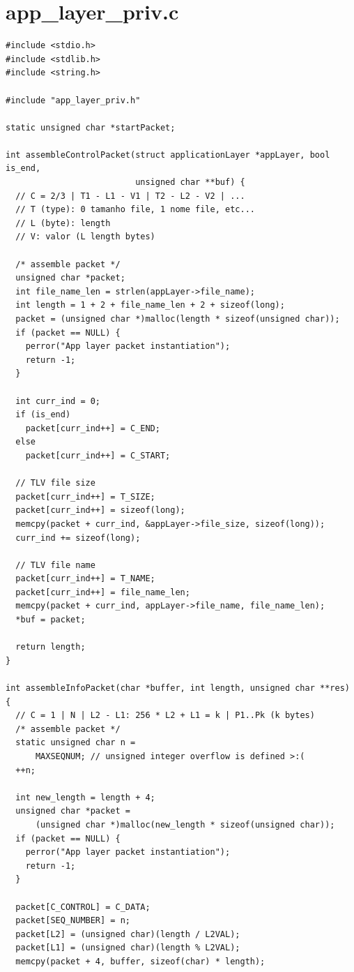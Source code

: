 \documentclass[11pt]{report}
\begin{document}
\section{app\_layer\_priv.c}

\begin{lstlisting}
#include <stdio.h>
#include <stdlib.h>
#include <string.h>

#include "app_layer_priv.h"

static unsigned char *startPacket;

int assembleControlPacket(struct applicationLayer *appLayer, bool is_end,
                          unsigned char **buf) {
  // C = 2/3 | T1 - L1 - V1 | T2 - L2 - V2 | ...
  // T (type): 0 tamanho file, 1 nome file, etc...
  // L (byte): length
  // V: valor (L length bytes)

  /* assemble packet */
  unsigned char *packet;
  int file_name_len = strlen(appLayer->file_name);
  int length = 1 + 2 + file_name_len + 2 + sizeof(long);
  packet = (unsigned char *)malloc(length * sizeof(unsigned char));
  if (packet == NULL) {
    perror("App layer packet instantiation");
    return -1;
  }

  int curr_ind = 0;
  if (is_end)
    packet[curr_ind++] = C_END;
  else
    packet[curr_ind++] = C_START;

  // TLV file size
  packet[curr_ind++] = T_SIZE;
  packet[curr_ind++] = sizeof(long);
  memcpy(packet + curr_ind, &appLayer->file_size, sizeof(long));
  curr_ind += sizeof(long);

  // TLV file name
  packet[curr_ind++] = T_NAME;
  packet[curr_ind++] = file_name_len;
  memcpy(packet + curr_ind, appLayer->file_name, file_name_len);
  *buf = packet;

  return length;
}

int assembleInfoPacket(char *buffer, int length, unsigned char **res) {
  // C = 1 | N | L2 - L1: 256 * L2 + L1 = k | P1..Pk (k bytes)
  /* assemble packet */
  static unsigned char n =
      MAXSEQNUM; // unsigned integer overflow is defined >:(
  ++n;

  int new_length = length + 4;
  unsigned char *packet =
      (unsigned char *)malloc(new_length * sizeof(unsigned char));
  if (packet == NULL) {
    perror("App layer packet instantiation");
    return -1;
  }

  packet[C_CONTROL] = C_DATA;
  packet[SEQ_NUMBER] = n;
  packet[L2] = (unsigned char)(length / L2VAL);
  packet[L1] = (unsigned char)(length % L2VAL);
  memcpy(packet + 4, buffer, sizeof(char) * length);


\end{lstlisting}
\end{document}
